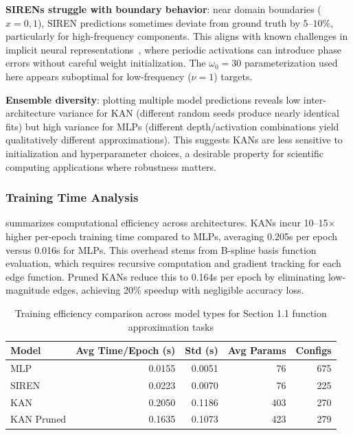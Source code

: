 \documentclass[11pt,a4paper]{article}
\begin{document}
\textbf{SIRENs struggle with boundary behavior}: near domain boundaries ($x = 0, 1$), SIREN predictions sometimes deviate from ground truth by $5$--$10\%$, particularly for high-frequency components. This aligns with known challenges in implicit neural representations~\citep{sitzmann2020implicit}, where periodic activations can introduce phase errors without careful weight initialization. The $\omega_0 = 30$ parameterization used here appears suboptimal for low-frequency ($\nu = 1$) targets.

\textbf{Ensemble diversity}: plotting multiple model predictions reveals low inter-architecture variance for KAN (different random seeds produce nearly identical fits) but high variance for MLPs (different depth/activation combinations yield qualitatively different approximations). This suggests KANs are less sensitive to initialization and hyperparameter choices, a desirable property for scientific computing applications where robustness matters.

\subsubsection{Training Time Analysis}

 summarizes computational efficiency across architectures. KANs incur 10--15$\times$ higher per-epoch training time compared to MLPs, averaging 0.205s per epoch versus 0.016s for MLPs. This overhead stems from B-spline basis function evaluation, which requires recursive computation and gradient tracking for each edge function. Pruned KANs reduce this to 0.164s per epoch by eliminating low-magnitude edges, achieving 20\% speedup with negligible accuracy loss.

\begin{table}[htbp]
\centering
\caption{Training efficiency comparison across model types for Section 1.1 function approximation tasks}
\label{tab:training_time}
\begin{tabular}{lrrrr}
\toprule
\textbf{Model} & \textbf{Avg Time/Epoch (s)} & \textbf{Std (s)} & \textbf{Avg Params} & \textbf{Configs} \\
\midrule
MLP        & 0.0155 & 0.0051 & 76  & 675 \\
SIREN      & 0.0223 & 0.0070 & 76  & 225 \\
KAN        & 0.2050 & 0.1186 & 403 & 270 \\
KAN Pruned & 0.1635 & 0.1073 & 423 & 279 \\
\bottomrule
\end{tabular}
\end{table}
\end{document}
